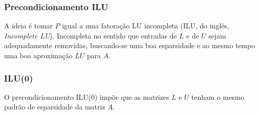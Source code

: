 \subsubsection{Precondicionamento ILU}

A ideia é tomar $P$ igual a uma fatoração LU incompleta (ILU, do inglês, {\it Incomplete LU}). Incompleta no sentido que entradas de $L$ e de $U$ sejam adequadamente removidas, buscando-se uma boa esparsidade e ao mesmo tempo uma boa aproximação $LU$ para $A$.

\subsubsection{ILU(0)}

O precondicionamento ILU(0) impõe que as matrizes $L$ e $U$ tenham o mesmo padrão de esparsidade da matriz $A$.

